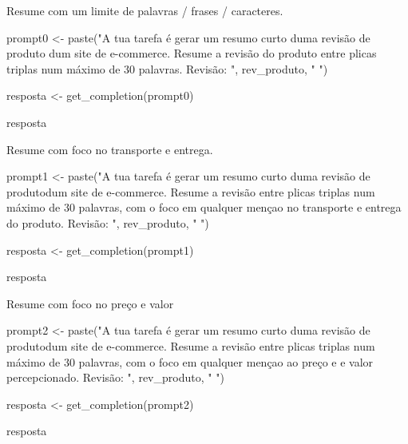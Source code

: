 \documentclass[
  letterpaper,
  paper=6in:9in,
  pagesize=pdftex,
  headinclude=on,
  footinclude=on,
  12pt]{scrbook}
\newenvironment{Shaded}{\begin{snugshade}}{\end{snugshade}}
\newcommand{\FunctionTok}[1]{\textcolor[rgb]{0.28,0.35,0.67}{#1}}
\newcommand{\NormalTok}[1]{\textcolor[rgb]{0.00,0.23,0.31}{#1}}
\newcommand{\OtherTok}[1]{\textcolor[rgb]{0.00,0.23,0.31}{#1}}
\newcommand{\StringTok}[1]{\textcolor[rgb]{0.13,0.47,0.30}{#1}}
\begin{document}
Resume com um limite de palavras / frases / caracteres.

\begin{Shaded}
\begin{Highlighting}[]
\NormalTok{prompt0 }\OtherTok{\textless{}{-}} \FunctionTok{paste}\NormalTok{(}\StringTok{"A tua tarefa é gerar um resumo curto duma revisão de produto dum site de e{-}commerce.}
\StringTok{                 Resume a revisão do produto entre plicas triplas num máximo de 30 palavras.}
\StringTok{                 Revisão: \textquotesingle{}\textquotesingle{}\textquotesingle{} "}\NormalTok{, rev\_produto, }\StringTok{" \textquotesingle{}\textquotesingle{}\textquotesingle{} "}\NormalTok{)}

\NormalTok{resposta }\OtherTok{\textless{}{-}} \FunctionTok{get\_completion}\NormalTok{(prompt0)}

\NormalTok{resposta}
\end{Highlighting}
\end{Shaded}

Resume com foco no transporte e entrega.

\begin{Shaded}
\begin{Highlighting}[]
\NormalTok{prompt1 }\OtherTok{\textless{}{-}} \FunctionTok{paste}\NormalTok{(}\StringTok{"A tua tarefa é gerar um resumo curto duma revisão de produtodum site de e{-}commerce.}
\StringTok{                 Resume a revisão entre plicas triplas num máximo de 30 palavras, }
\StringTok{                 com o foco em qualquer mençao no transporte e entrega do produto.}
\StringTok{                 Revisão: \textquotesingle{}\textquotesingle{}\textquotesingle{} "}\NormalTok{, rev\_produto, }\StringTok{" \textquotesingle{}\textquotesingle{}\textquotesingle{} "}\NormalTok{)}

\NormalTok{resposta }\OtherTok{\textless{}{-}} \FunctionTok{get\_completion}\NormalTok{(prompt1)}

\NormalTok{resposta}
\end{Highlighting}
\end{Shaded}

Resume com foco no preço e valor

\begin{Shaded}
\begin{Highlighting}[]
\NormalTok{prompt2 }\OtherTok{\textless{}{-}} \FunctionTok{paste}\NormalTok{(}\StringTok{"A tua tarefa é gerar um resumo curto duma revisão de produtodum site de e{-}commerce.}
\StringTok{                 Resume a revisão entre plicas triplas num máximo de 30 palavras, }
\StringTok{                 com o foco em qualquer mençao ao preço e e valor percepcionado.}
\StringTok{                 Revisão: \textquotesingle{}\textquotesingle{}\textquotesingle{} "}\NormalTok{, rev\_produto, }\StringTok{" \textquotesingle{}\textquotesingle{}\textquotesingle{} "}\NormalTok{)}

\NormalTok{resposta }\OtherTok{\textless{}{-}} \FunctionTok{get\_completion}\NormalTok{(prompt2)}

\NormalTok{resposta}
\end{Highlighting}
\end{Shaded}
\end{document}

